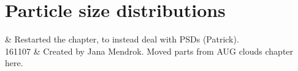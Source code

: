 
\chapter{Particle size distributions}
 \label{sec:cloudtheory}

 & Restarted the chapter, to instead deal with PSDs (Patrick).\\
 161107 & Created by Jana Mendrok. Moved parts from AUG clouds chapter here.\\
\stophistory


\def\no{N_0}
\def\ntot{N_{\mathrm{tot}}}
\def\la{\Lambda}
\def\ga{\gamma}
\def\dg{D_g}
\def\xmed{x_\mathrm{med}}
\def\xmea{x_\mathrm{mean}}
\def\mmea{m_\mathrm{mean}}
\def\eterm{e}
\def\rterm{r}



